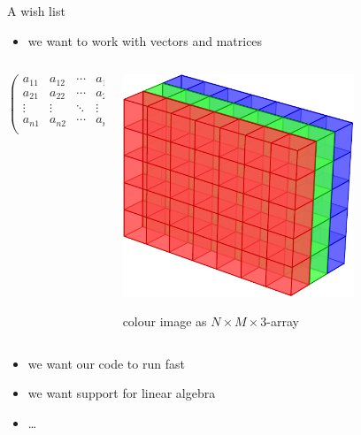 \documentclass[svgnames]{beamer}
\begin{document}
\begin{frame}{A wish list}
 \begin{itemize}
  \item we want to work with vectors and matrices
 \end{itemize}

 \begin{columns}
  \begin{column}{0.55\textwidth}
   \begin{displaymath}
    \begin{pmatrix}
     a_{11} & a_{12} & \cdots & a_{1n}\\
     a_{21} & a_{22} & \cdots & a_{2n}\\
     \vdots & \vdots & \ddots & \vdots\\
     a_{n1} & a_{n2} & \cdots & a_{nn}\\
    \end{pmatrix}
   \end{displaymath}
  \end{column}%
  \begin{column}{0.45\textwidth}
   \includegraphics[width=0.7\textwidth]{rgbarray}

   colour image as $N\times M\times3$-array
  \end{column}
 \end{columns}

 \begin{itemize}
  \item we want our code to run fast
  \item we want support for linear algebra
  \item \dots 
 \end{itemize}
\end{frame}
\end{document}
